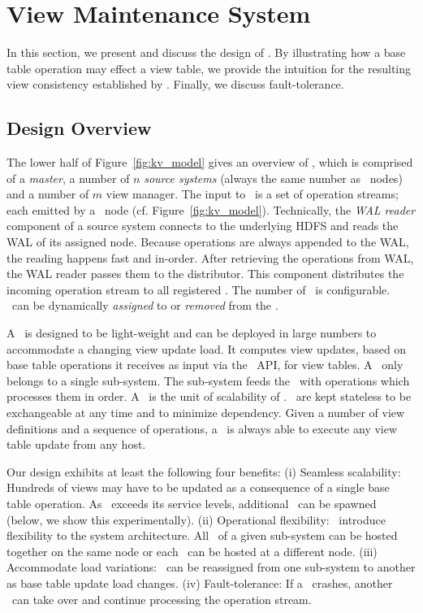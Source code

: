 \section{View Maintenance System} 
\label{sec:view_maintenance_system} 

In this section, we present and discuss the design of \VMS. By
illustrating how a base table operation may effect a view table, we
provide the intuition for the resulting view consistency established
by \VMS.  Finally, we discuss fault-tolerance.

\subsection{Design Overview}

The lower half of Figure~\ref{fig:kv_model} gives an overview of \VMS, 
which is comprised of a \textit{master}, a number of $n$ 
\textit{source systems} (always the same number as \KVS\ nodes) and
a number of $m$ view manager. The 
input to \VMS\ is a set of operation streams; each emitted by a \KVS\ 
node (cf. Figure~\ref{fig:kv_model}). Technically, the \textit{WAL 
reader} component of a source system connects to the underlying HDFS and 
reads the WAL of its assigned node. Because operations are always 
appended to the WAL, the reading happens fast and in-order. After 
retrieving the operations from WAL, the WAL reader passes them to the 
distributor. This component distributes the incoming operation stream to 
all registered \VMs. The number of \VMs\ is configurable. \VMs\ can be 
dynamically \textit{assigned} to or \textit{removed} from the \VMS. 


A \VM\ is designed to be light-weight and can be deployed in large
numbers to accommodate a changing view update load. It computes view
updates, based on base table operations it receives as input via the
\KVS\ API, for view tables. A \VM\ only belongs to a single
sub-system. The sub-system feeds the \VM\ with operations which
processes them in order.  A \VM\ is the unit of scalability of
\VMS. \VMs\ are kept stateless to be exchangeable at any time and to
minimize dependency. Given a number of view definitions and a sequence
of operations, a \VM\ is always able to execute any view table update
from any host.

Our design exhibits at least the following four benefits: (i) Seamless
scalability: Hundreds of views may have to be updated as a consequence
of a single base table operation. As \VMS\ exceeds its service levels,
additional \VMs\ can be spawned (below, we show this
experimentally). (ii) Operational flexibility: \VMs\ introduce
flexibility to the system architecture. All \VMs\ of a given
sub-system can be hosted together on the same node or each \VM\ can be
hosted at a different node. (iii) Accommodate load variations:
\VMs\ can be reassigned from one sub-system to another as base table
update load changes. (iv) Fault-tolerance: If a \VM\ crashes, another
\VM\ can take over and continue processing the operation stream.

